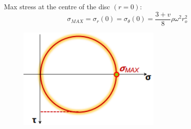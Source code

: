 \documentclass[class=report, crop=false, 12pt,a4paper]{standalone}
\begin{document}
Max stress at the centre of the disc $(r=0)$:
\begin{equation}
    \sigma_{MAX} = \sigma_r (0) = \sigma_{\theta} (0) = \frac{3+v}{8}\rho \omega^2 r^2_o
\end{equation}
\begin{figure}[H]
    \centering
    \includegraphics[height = 5cm]{../img/diagram132.png}
    \caption{}
\end{figure}
\end{document}
